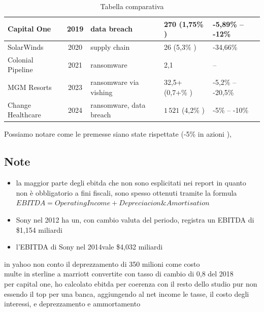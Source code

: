 \documentclass[12pt,a4paper,openright,twoside]{report}
\begin{document}
\begin{table}[H]
\begin{tabular}{|p{}|c|p{3cm}|p{}|p{}|}
         \hline
         Capital One & 2019 & data breach & 270  (1,75\% \cite{capital_one_2019_10k}) & -5,89\% -- -12\% \\
         \hline
         SolarWinds & 2020 & supply chain & 26  (5,3\% \cite{solarwinds_2020_10k}) & -34,66\% \\
         \hline
        Colonial Pipeline & 2021 & ransomware & 2,1   & -- \\
         \hline
         MGM Resorts & 2023 & ransomware via vishing & 32,5+  (0,7+\% \cite{mgm_2023_10k}) &  -5,2\% -- -20,5\% \\
         \hline
         Change Healthcare & 2024 & ransomware, data breach & $1\,521$  (4,2\% \cite{unh_2024_10k}) & -5\% -- -10\% \\
         \hline
    \end{tabular}
    \caption{Tabella comparativa}
    \label{tab:analisys}
\end{table}

Possiamo notare come le premesse siano state rispettate (-5\% in azioni \cite{accenture2010}),
\subsection{Note} 
\begin{itemize}
    \item la maggior parte degli ebitda che non sono esplicitati nei report in quanto non \`e obbligatorio a fini fiscali, sono spesso ottenuti tramite  la formula $EBITDA = Operating Income + Depreciacion\&Amortisation$
    \item Sony nel 2012 ha un, con cambio valuta del periodo, registra un EBITDA di \$1,154 miliardi
    \item l'EBITDA di Sony nel 2014vale \$4,032 miliardi
\end{itemize}





in yahoo non conto il deprezzamento di 350 milioni come costo\\

multe in sterline a marriott convertite con tasso di cambio di 0,8 del 2018\\

per capital one, ho calcolato ebitda per coerenza con il resto dello studio pur non essendo il top per una banca, aggiungendo al net income le tasse, il costo degli interessi, e deprezzamento e ammortamento\\
\end{document}
